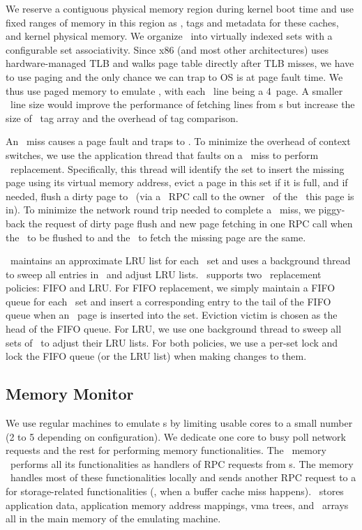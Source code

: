 We reserve a contiguous physical memory region during kernel boot time
and use fixed ranges of memory in this region as \excache, tags and metadata for these caches, and kernel physical memory. 
We organize \excache\ into virtually indexed sets with a configurable set associativity.
Since x86 (and most other architectures) uses hardware-managed TLB and walks page table directly after TLB misses, 
we have to use paging and the only chance we can trap to OS is at page fault time. 
We thus use paged memory to emulate \excache, 
with each \excache\ line being a 4\KB\ page.
A smaller \excache\ line size would improve the performance of fetching lines from \mcomponent{}s
but increase the size of \excache\ tag array and the overhead of tag comparison. 

An \excache\ miss causes a page fault and traps to \lego.
To minimize the overhead of context switches,
we use the application thread that faults on a \excache\ miss
to perform \excache\ replacement.
Specifically, this thread will identify the set to insert the missing page
using its virtual memory address,
evict a page in this set if it is full,
and if needed, flush a dirty page to \mcomponent\ 
(via a \lego\ RPC call to the owner \mcomponent\ of the \vregion\ this page is in).
To minimize the network round trip needed to complete a \excache\ miss,
we piggy-back the request of dirty page flush and new page fetching
in one RPC call when the \mcomponent\ to be flushed to and the \mcomponent\ to fetch the missing page are the same.

\lego\ maintains an approximate LRU list for each \excache\ set 
and uses a background thread to sweep all entries in \excache\ and adjust LRU lists.
\lego\ supports two \excache\ replacement policies:
FIFO and LRU. For FIFO replacement, we simply maintain a FIFO queue for each \excache\ set and insert a
corresponding entry to the tail of the FIFO queue when
an \excache\ page is inserted into the set. Eviction victim is chosen as the head of the FIFO queue. 
For LRU, we use one background thread to sweep all sets of \excache\ to adjust their LRU lists.
For both policies, we use a per-set lock and lock the FIFO queue (or the LRU list) when
making changes to them.

\subsection{Memory Monitor}
\label{sec:lego:memimpl}

We use regular machines to emulate \mcomponent{}s 
by limiting usable cores to a small number (2 to 5 depending on configuration).
We dedicate one core to busy poll network requests 
and the rest for performing memory functionalities. 
The \lego\ memory \microos\ performs all its functionalities as handlers of RPC requests from \pcomponent{}s.
The memory \microos\ handles most of these functionalities locally
and sends another RPC request to a \scomponent{} for storage-related functionalities (\eg, when a buffer cache miss happens).
\lego\ stores application data, application memory address mappings, vma trees, and \vregion\ arrays
all in the main memory of the emulating machine. 

